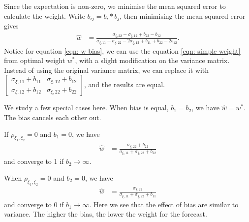 \documentclass[11pt]{article}
\begin{document}
Since the expectation is non-zero, we minimise the mean squared error to calculate the weight.
Write \(b_{ij}=b_i*b_j\), then minimising the mean squared error gives
\begin{equation}
\label{eqn: w bias}
\begin{aligned}
\hat{w} &= \frac{\sigma_{\xi,22}-\sigma_{\xi,12}+b_{22}-b_{12}}{\sigma_{\xi,11}+\sigma_{\xi,22}-2\sigma_{\xi,12}+b_{11}+b_{22}-2b_{12}}.
\end{aligned}
\end{equation}
Notice for equation \ref{eqn: w bias}, we can use the equation \ref{eqn: simple weight} from optimal weight $w^*$, with a slight modification on the variance matrix. Instead of using the original variance matrix, we can replace it with
\(\begin{bmatrix}\sigma_{\xi,11}+b_{11} & \sigma_{\xi,12}+b_{12}\\ \sigma_{\xi,12}+b_{12} & \sigma_{\xi,22}+b_{22}\end{bmatrix}\), and the results are equal.

We study a few special cases here. When bias is equal, $b_1=b_2$, we have $\hat{w}=w^*$. The bias cancels each other out. 

If $\rho_{\xi_1,\xi_2}=0$ and $b_1=0$, we have
\begin{equation}
\begin{aligned}
\hat{w} &= \frac{\sigma_{\xi,22}+b_{22}}{\sigma_{\xi,11}+\sigma_{\xi,22}+b_{22}}
\end{aligned}
\end{equation}
and converge to 1 if $b_2 \to \infty$.

When $\rho_{\xi_1,\xi_2}=0$ and $b_2=0$, we have
\begin{equation}
\begin{aligned}
\hat{w} &= \frac{\sigma_{\xi,22}}{\sigma_{\xi,11}+\sigma_{\xi,22}+b_{11}}
\end{aligned}
\end{equation}
and converge to 0 if $b_1 \to \infty$. Here we see that the effect of bias are similar to variance. The higher the bias, the lower the weight for the forecast.
\end{document}
